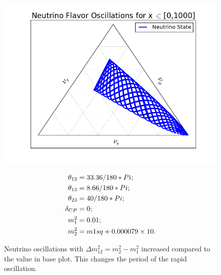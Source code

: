 \documentclass[letterpaper,12pt,english]{sphinxmanual}
\begin{document}
\begin{figure}[htbp]
\centering
\capstart

\includegraphics{1000-5.png}
\caption{Neutrino oscillations with \(\Delta m_{12}^2 = m_2^2- m_1^2\) increased compared to the value in base plot. This changes the period of the rapid oscillation.}{\small \begin{gather}
\begin{split}\theta_{12} &= 33.36/180*Pi; \\
\theta_{13} &= 8.66/180 *Pi; \\
\theta_{23} &= 40/180*Pi;\\
\delta_{CP} &= 0;\\
m_1^2 &= 0.01;\\
m_2^2 &= m1sq + 0.000079\times 10.\end{split}\notag
\end{gather}}\end{figure}
\end{document}
